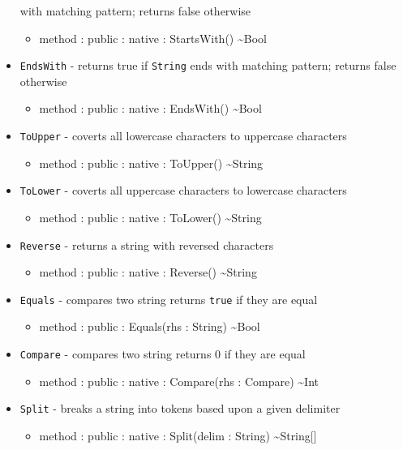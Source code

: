 \documentclass[12pt]{article}
\begin{document}
\begin{itemize}
  with matching pattern; returns false otherwise
  \begin{itemize}
  \item method : public : native : StartsWith() \textasciitilde Bool
  \end{itemize}
\item \texttt{EndsWith} - returns true if \texttt{String} ends with
  matching pattern; returns false otherwise
  \begin{itemize}
  \item method : public : native : EndsWith() \textasciitilde Bool
  \end{itemize}
\item \texttt{ToUpper} - coverts all lowercase characters to uppercase
  characters
  \begin{itemize}
  \item method : public : native : ToUpper() \textasciitilde String
  \end{itemize}
\item \texttt{ToLower} - coverts all uppercase characters to lowercase
  characters
  \begin{itemize}
  \item method : public : native : ToLower() \textasciitilde String
  \end{itemize}
\item \texttt{Reverse} - returns a string with reversed characters
  \begin{itemize}
  \item method : public : native : Reverse() \textasciitilde String
  \end{itemize}
\item \texttt{Equals} - compares two string returns \texttt{true} if
  they are equal
  \begin{itemize}
  \item method : public : Equals(rhs : String) \textasciitilde Bool
  \end{itemize}
\item \texttt{Compare} - compares two string returns 0 if they are
  equal
  \begin{itemize}
  \item method : public : native : Compare(rhs : Compare) \textasciitilde Int
  \end{itemize}
\item \texttt{Split} - breaks a string into tokens based upon a given
  delimiter
  \begin{itemize}
  \item method : public : native : Split(delim : String) \textasciitilde String[]

\end{itemize}
\end{itemize}
\end{document}
